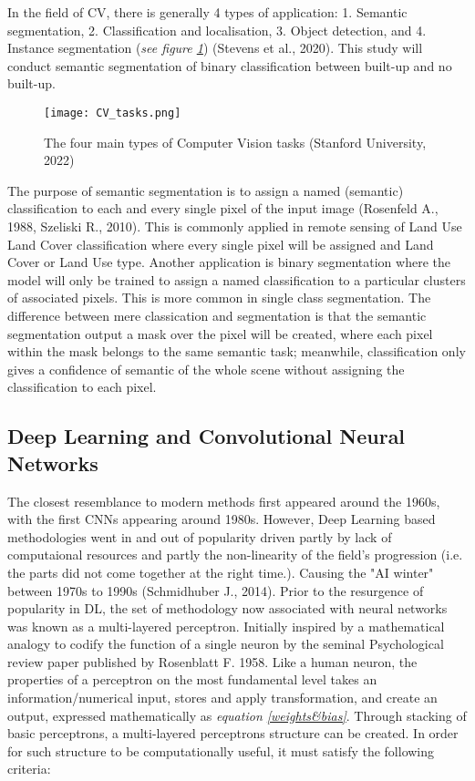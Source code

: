 \documentclass[11pt, a4paper, twoside]{report}
\begin{document}
In the field of CV, there is generally 4 types of application: 1. Semantic segmentation, 2. Classification and localisation, 3. Object detection, and 4. Instance segmentation (\textit{see figure {\ref{fig:CV_tasks}}}) (Stevens et al., 2020). This study will conduct semantic segmentation of binary classification between built-up and no built-up.\\\par

\begin{figure}[h!]
\centering
\texttt{[image: CV\_tasks.png]}
  \caption{The four main types of Computer Vision tasks (Stanford University, 2022)}
\label{fig:CV_tasks}
\end{figure}

The purpose of semantic segmentation is to assign a named (semantic) classification to each and every single pixel of the input image (Rosenfeld A., 1988, Szeliski R., 2010). This is commonly applied in remote sensing of Land Use Land Cover classification where every single pixel will be assigned and Land Cover or Land Use type. Another application is binary segmentation where the model will only be trained to assign a named classification to a particular clusters of associated pixels. This is more common in single class segmentation. The difference between mere classication and segmentation is that the semantic segmentation output a mask over the pixel will be created, where each pixel within the mask belongs to the same semantic task; meanwhile, classification only gives a confidence of semantic of the whole scene without assigning the classification to each pixel.\\\par

\subsection{Deep Learning and Convolutional Neural Networks}

The closest resemblance to modern methods first appeared around the 1960s, with the first CNNs appearing around 1980s. However, Deep Learning based methodologies went in and out of popularity driven partly by lack of computaional resources and partly the non-linearity of the field's progression (i.e. the parts did not come together at the right time.). Causing the "AI winter" between 1970s to 1990s (Schmidhuber J., 2014). Prior to the resurgence of popularity in DL, the set of methodology now associated with neural networks was known as a multi-layered perceptron. Initially inspired by a mathematical analogy to codify the function of a single neuron by the seminal Psychological review paper published by Rosenblatt F. 1958. Like a human neuron, the properties of a perceptron on the most fundamental level takes an information/numerical input, stores and apply transformation, and create an output, expressed mathematically as \textit{equation \ref{weights&bias}}. Through stacking of basic perceptrons, a multi-layered perceptrons structure can be created. In order for such structure to be computationally useful, it must satisfy the following criteria:\\\par
\end{document}
